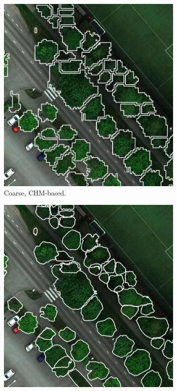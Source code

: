 \documentclass[english, 12pt, a4paper, sci, utf8, a-2b, online]{aaltothesis}
\begin{document}
\begin{figure}[h]
    \centering
    \begin{subfigure}[b]{0.32\textwidth}
        \includegraphics[width=1.0\textwidth]{figures/annotations/coarse.png}
        \caption{Coarse, CHM-based.}
    \end{subfigure}
    \begin{subfigure}[b]{0.32\textwidth}
        \includegraphics[width=1.0\textwidth]{figures/annotations/pseudolabeled.png}

\end{subfigure}
\end{figure}
\end{document}

